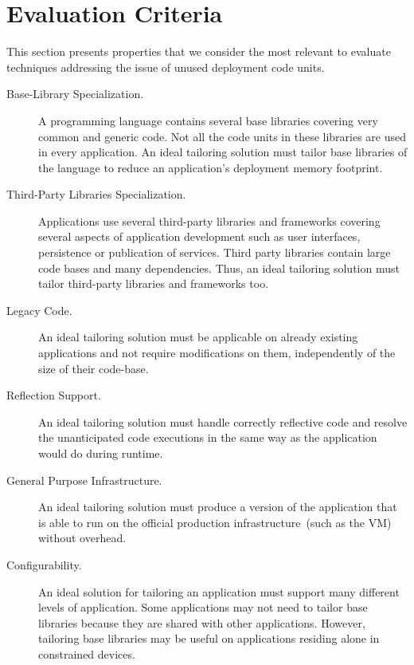\section{Evaluation Criteria}\label{sec:tailoring_criteria}

This section presents properties that we consider the most relevant to evaluate techniques addressing the issue of unused deployment code units.

\begin{description}

\item[Base-Library Specialization.] A programming language contains several base libraries covering very common and generic code. Not all the code units in these libraries are used in every application. An ideal tailoring solution must tailor base libraries of the language to reduce an application's deployment memory footprint.

\item[Third-Party Libraries Specialization.] Applications use several third-party libraries and frameworks covering several aspects of application development such as user interfaces, persistence or publication of services. Third party libraries contain large code bases and many dependencies. Thus, an ideal tailoring solution must tailor third-party libraries and frameworks too.

\item[Legacy Code.] An ideal tailoring solution must be applicable on already existing applications and not require modifications on them, independently of the size of their code-base.

\item[Reflection Support.] An ideal tailoring solution must handle correctly reflective code and resolve the unanticipated code executions in the same way as the application would do during runtime.

\item[General Purpose Infrastructure.] An ideal tailoring solution must produce a version of the application that is able to run on the official production infrastructure~(such as the VM) without overhead.

\item[Configurability.] An ideal solution for tailoring an application must support many different levels of application. Some applications may not need to tailor base libraries because they are shared with other applications. However, tailoring base libraries may be useful on applications residing alone in constrained devices.


\end{description}
